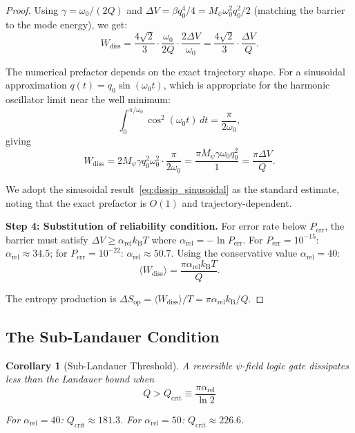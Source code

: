 \documentclass[11pt,twocolumn]{article}
\newtheorem{corollary}[theorem]{Corollary}
\theoremstyle{definition}
\theoremstyle{remark}
\newcommand{\kB}{k_{\mathrm{B}}}
\begin{document}
\begin{proof}
Using $\gamma = \omega_0/(2Q)$ and $\Delta V = \beta q_0^4/4 =
M_\psi\omega_0^2 q_0^2/2$ (matching the barrier to the mode energy), we
get:
\begin{equation}
W_{\mathrm{diss}} = \frac{4\sqrt{2}}{3}\cdot\frac{\omega_0}{2Q}
\cdot\frac{2\Delta V}{\omega_0} = \frac{4\sqrt{2}}{3}\cdot\frac{\Delta V}{Q}.
\label{eq:dissip_barrier}
\end{equation}

The numerical prefactor depends on the exact trajectory shape. For a
sinusoidal approximation $q(t) = q_0\sin(\omega_0 t)$, which is
appropriate for the harmonic oscillator limit near the well minimum:
\begin{equation}
\int_0^{\pi/\omega_0}\cos^2(\omega_0 t)\,dt = \frac{\pi}{2\omega_0},
\end{equation}
giving
\begin{equation}
W_{\mathrm{diss}} = 2M_\psi\gamma q_0^2\omega_0^2\cdot\frac{\pi}{2\omega_0}
= \frac{\pi M_\psi\gamma\omega_0 q_0^2}{1}
= \frac{\pi\Delta V}{Q}.
\label{eq:dissip_sinusoidal}
\end{equation}

We adopt the sinusoidal result~\eqref{eq:dissip_sinusoidal} as the
standard estimate, noting that the exact prefactor is $O(1)$ and
trajectory-dependent.

\textbf{Step 4: Substitution of reliability condition.}
For error rate below $P_{\mathrm{err}}$, the barrier must satisfy
$\Delta V \geq \alpha_{\mathrm{rel}}\kB T$ where $\alpha_{\mathrm{rel}}
= -\ln P_{\mathrm{err}}$. For $P_{\mathrm{err}} = 10^{-15}$:
$\alpha_{\mathrm{rel}} \approx 34.5$; for $P_{\mathrm{err}} =
10^{-22}$: $\alpha_{\mathrm{rel}} \approx 50.7$. Using the conservative
value $\alpha_{\mathrm{rel}} = 40$:
\begin{equation}
\langle W_{\mathrm{diss}}\rangle = \frac{\pi\alpha_{\mathrm{rel}}\kB T}{Q}.
\end{equation}

The entropy production is $\Delta S_{\mathrm{op}} = \langle
W_{\mathrm{diss}}\rangle/T = \pi\alpha_{\mathrm{rel}}\kB/Q$.
\end{proof}

\subsection{The Sub-Landauer Condition}\label{sec:sub_landauer_condition}

\begin{corollary}[Sub-Landauer Threshold]
\label{cor:sub_landauer}
A reversible $\psi$-field logic gate dissipates less than the Landauer
bound when
\begin{equation}
\boxed{
Q > Q_{\mathrm{crit}} \equiv \frac{\pi\alpha_{\mathrm{rel}}}{\ln 2}
}
\label{eq:Q_critical}
\end{equation}

For $\alpha_{\mathrm{rel}} = 40$: $Q_{\mathrm{crit}} \approx 181.3$.
For $\alpha_{\mathrm{rel}} = 50$: $Q_{\mathrm{crit}} \approx 226.6$.
\end{corollary}
\end{document}
